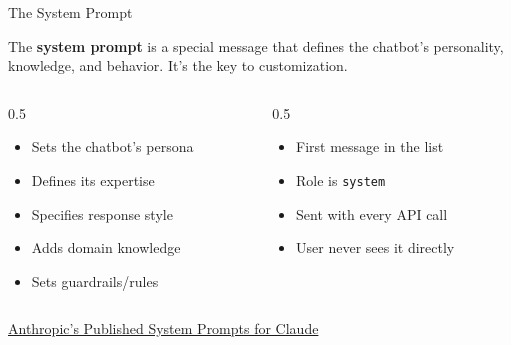 \documentclass[aspectratio=169]{beamer}
\begin{document}
\begin{frame}{The System Prompt}
\begin{shadedbox}
The \textbf{system prompt} is a special message that defines the chatbot's personality, knowledge, and behavior. It's the key to customization.
\end{shadedbox}
\vspace{0.3cm}
\begin{columns}[T]
\begin{column}{0.5\textwidth}
\begin{shadedbox}[title=\textbf{What It Does}]
\begin{itemize}\small
  \item Sets the chatbot's persona
  \item Defines its expertise
  \item Specifies response style
  \item Adds domain knowledge
  \item Sets guardrails/rules
\end{itemize}
\end{shadedbox}
\end{column}
\begin{column}{0.5\textwidth}
\begin{shadedbox}[title=\textbf{Placement}]
\begin{itemize}\small
  \item First message in the list
  \item Role is \texttt{system}
  \item Sent with every API call
  \item User never sees it directly
\end{itemize}
\end{shadedbox}
\end{column}
\end{columns}
\vspace{0.3cm}
\begin{shadedbox}
\centerline{\href{https://docs.anthropic.com/en/release-notes/system-prompts}{Anthropic's Published System Prompts for Claude}}
\end{shadedbox}
\end{frame}
\end{document}
